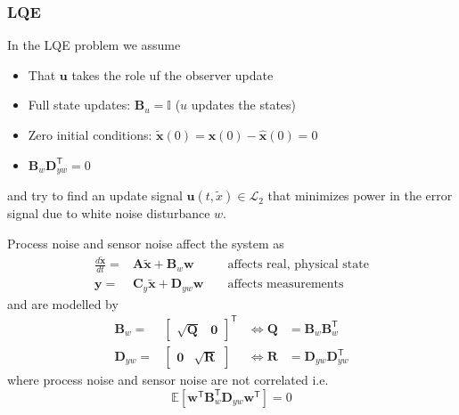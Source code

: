 \subsubsection{LQE}

\newpar{}

In the LQE problem we assume
\begin{itemize}
    \item That $\mathbf{u}$ takes the role uf the observer update
    \item Full state updates: $\mathbf{B}_u=\mathbf{\mathbb{I}}$ ($u$ updates the states)
    \item Zero initial conditions: $\tilde{\mathbf{x}}(0)=\mathbf{x}(0)-\hat{\mathbf{x}}(0)=0$
    \item $\mathbf{B}_w \mathbf{D}_{yw}^{\mathsf{T}}=0$
\end{itemize}
and try to find an update signal $\mathbf{u}(t,\tilde{x})\in \mathcal{L}_2$ that minimizes power in the error signal due to white noise disturbance $w$.

\newpar{}

Process noise and sensor noise affect the system as
\begin{align*}
    \frac{d\tilde{\mathbf{x}} }{dt}= & \mathbf{A}\tilde{\mathbf{x}}+\mathbf{B}_{w} \mathbf{w}   &  & \text{ affects real, physical state} \\
    \mathbf{y}=                      & \mathbf{C}_y\tilde{\mathbf{x}}+\mathbf{D}_{yw}\mathbf{w} &  & \text{ affects measurements}
\end{align*}
and are modelled by
\begin{align*}
    \mathbf{B}_w=    & \begin{bmatrix}\sqrt{\mathbf{Q}}&\mathbf{0}\end{bmatrix}^{\mathsf{T}} & \Leftrightarrow \mathbf{Q}          & = \mathbf{B}_w\mathbf{B}_w^{\mathsf{T}}       \\
    \mathbf{D}_{yw}= & \begin{bmatrix}\mathbf{0}&\sqrt{\mathbf{R}}\end{bmatrix}              & \Leftrightarrow \mathbf{\mathbf{R}} & = \mathbf{D}_{yw}\mathbf{D}_{yw}^{\mathsf{T}}
\end{align*}
where process noise and sensor noise are not correlated i.e.
\begin{equation*}
    \mathbb{E}\left[\mathbf{w}^{\mathsf{T}} \mathbf{B}_w^{\mathsf{T}} \mathbf{D}_{yw}\mathbf{w}^{\mathsf{T}}\right]=0
\end{equation*}

